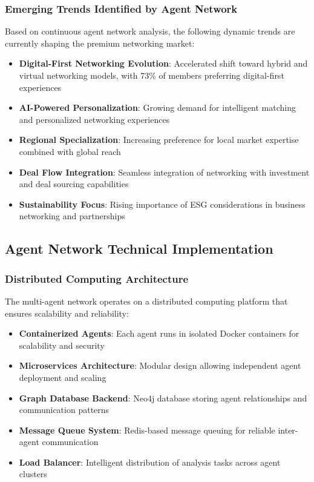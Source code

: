 \subsubsection{Emerging Trends Identified by Agent Network}

Based on continuous agent network analysis, the following dynamic trends are currently shaping the premium networking market:

\begin{itemize}
    \item \textbf{Digital-First Networking Evolution}: Accelerated shift toward hybrid and virtual networking models, with 73\% of members preferring digital-first experiences
    \item \textbf{AI-Powered Personalization}: Growing demand for intelligent matching and personalized networking experiences
    \item \textbf{Regional Specialization}: Increasing preference for local market expertise combined with global reach
    \item \textbf{Deal Flow Integration}: Seamless integration of networking with investment and deal sourcing capabilities
    \item \textbf{Sustainability Focus}: Rising importance of ESG considerations in business networking and partnerships
\end{itemize}

\subsection{Agent Network Technical Implementation}

\subsubsection{Distributed Computing Architecture}

The multi-agent network operates on a distributed computing platform that ensures scalability and reliability:

\begin{itemize}
    \item \textbf{Containerized Agents}: Each agent runs in isolated Docker containers for scalability and security
    \item \textbf{Microservices Architecture}: Modular design allowing independent agent deployment and scaling
    \item \textbf{Graph Database Backend}: Neo4j database storing agent relationships and communication patterns
    \item \textbf{Message Queue System}: Redis-based message queuing for reliable inter-agent communication
    \item \textbf{Load Balancer}: Intelligent distribution of analysis tasks across agent clusters
\end{itemize}

